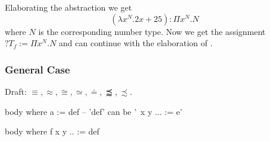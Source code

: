Elaborating the abstraction we get
$$
    (\lambda x^N. 2x + 25): \Pi x^N. N
$$
where $N$ is the corresponding number type. Now we get the assignment $?T_f :=
\Pi x^N. N$ and can continue with the elaboration of .


\vskip 5mm
\subsubsection{General Case}

Draft: $\equiv, \approx, \cong, \simeq, \doteq, \precapprox, \precsim$.



\begin{alba}
    body
    where
        a := def   -- 'def' can be '\ x y ... := e'

    body
    where
        f x y .. := def
\end{alba}
